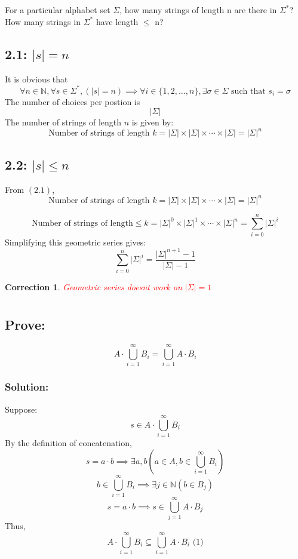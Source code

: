 \documentclass[12pt]{article}
\newtheorem{Correction}{Correction}
\begin{document}
\section{}
For a particular alphabet set \(\Sigma\), how many strings of length n are there in \(\Sigma^*\)? 
How many strings in \(\Sigma^*\) have length \(\leq\) n?

\subsection*{2.1: \(|s| = n\)}
It is obvious that 
\[
\forall n \in \mathbb{N}, \forall s \in \Sigma^*, (|s| = n) \implies \forall i \in \{1, 2, \dots, n\}, \exists \sigma \in \Sigma \text{ such that } s_i = \sigma
\]
The number of choices per postion is 
\[|\Sigma|\]
The number of strings of length \( n \) is given by:
\[
\text{Number of strings of length } k = |\Sigma| \times |\Sigma| \times \cdots \times |\Sigma| = |\Sigma|^n
\]

\subsection*{2.2: \(|s| \leq n\)}
From \((2.1)\), 
\[
\text{Number of strings of length } k = |\Sigma| \times |\Sigma| \times \cdots \times |\Sigma| = |\Sigma|^n
\]

\[
\text{Number of strings of length} \leq k = |\Sigma|^0 \times |\Sigma|^1 \times \cdots \times |\Sigma|^n = \sum_{i=0}^{n}|\Sigma|^i
\]
Simplifying this geometric series gives:
\[\sum_{i=0}^{n}|\Sigma|^i = \frac{|\Sigma|^{n+1}-1}{|\Sigma|-1}\]
\begin{Correction}
    \textcolor{red}{Geometric series doesnt work on \(|\Sigma| = 1\)}
\end{Correction}
\section{}
\subsection*{Prove:}
\[
A\cdot\bigcup\limits_{i=1}^{\infty} B_i=\bigcup\limits_{i=1}^{\infty}A\cdot B_i
\]
\subsubsection*{Solution:}
Suppose:
\[s\in A\cdot\bigcup\limits_{i=1}^{\infty} B_i\]
By the definition of concatenation,
\[s = a \cdot b \implies \exists a, b (a \in A, b\in\bigcup\limits_{i=1}^{\infty} B_i )\]
\[b\in\bigcup\limits_{i=1}^{\infty} B_i \implies\exists j \in \mathbb{N}(b \in B_j)\]
\[s = a \cdot b \implies s \in \bigcup\limits_{j=1}^{\infty}A\cdot B_j\]
Thus,
\[
A\cdot\bigcup\limits_{i=1}^{\infty} B_i \subseteq \bigcup\limits_{i=1}^{\infty}A\cdot B_i   \text{      (1)}
\]
\end{document}
